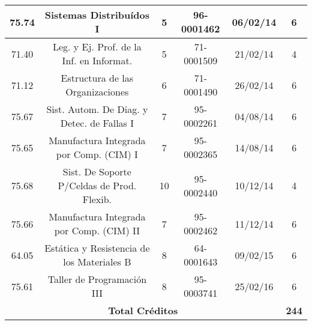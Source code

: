 {\begin{center}
\begin{tabular}{|c|c|c|c|c|c|}
            \hline 
            75.74 & Sistemas Distribuídos I                    & 5  & 96-0001462 & 06/02/14 & 6 \\
            \hline
            71.40 & Leg. y Ej. Prof. de la Inf. en Informat.   & 5  & 71-0001509 & 21/02/14 & 4 \\
            \hline
            71.12 & Estructura de las Organizaciones           & 6  & 71-0001490 & 26/02/14 & 6 \\
            \hline
            75.67 & Sist. Autom. De Diag. y Detec. de Fallas I & 7  & 95-0002261 & 04/08/14 & 6 \\
            \hline
            75.65 & Manufactura Integrada por Comp. (CIM) I    & 7  & 95-0002365 & 14/08/14 & 6 \\
            \hline
            75.68 & Sist. De Soporte P/Celdas de Prod. Flexib. & 10 & 95-0002440 & 10/12/14 & 4 \\
            \hline
            75.66 & Manufactura Integrada por Comp. (CIM) II   & 7  & 95-0002462 & 11/12/14 & 6 \\
            \hline
            64.05 & Estática y Resistencia de los Materiales B & 8  & 64-0001643 & 09/02/15 & 6 \\
            \hline
            75.61 & Taller de Programación III                 & 8  & 95-0003741 & 25/02/16 & 6 \\
            \hline
            \multicolumn{5}{|c|}{\textbf{Total Créditos}} & \textbf{244} \\
            \hline
        \end{tabular}
        \end{center}
    }
